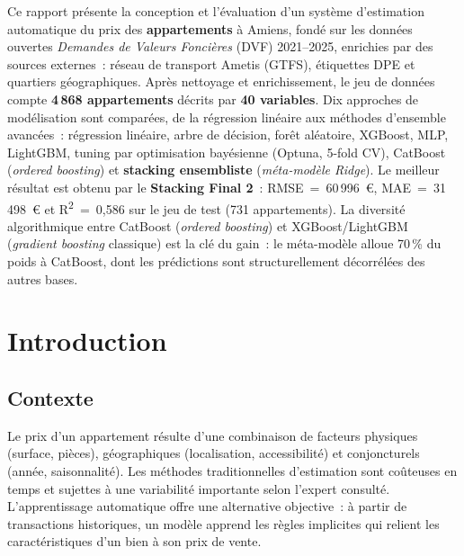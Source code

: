 \documentclass[12pt,a4paper]{article}
\begin{document}
\vspace{0.3cm}

Ce rapport pr\'esente la conception et l'\'evaluation d'un syst\`eme d'estimation automatique du prix des \textbf{appartements} \`a Amiens, fond\'e sur les donn\'ees ouvertes \textit{Demandes de Valeurs Fonci\`eres} (DVF) 2021--2025, enrichies par des sources externes~: r\'eseau de transport Ametis (GTFS), \'etiquettes DPE et quartiers g\'eographiques. Apr\`es nettoyage et enrichissement, le jeu de donn\'ees compte \textbf{4\,868 appartements} d\'ecrits par \textbf{40 variables}. Dix approches de mod\'elisation sont compar\'ees, de la r\'egression lin\'eaire aux m\'ethodes d'ensemble avanc\'ees~: r\'egression lin\'eaire, arbre de d\'ecision, for\^et al\'eatoire, XGBoost, MLP, LightGBM, tuning par optimisation bay\'esienne (Optuna, 5-fold CV), CatBoost (\textit{ordered boosting}) et \textbf{stacking ensembliste} (\textit{m\'eta-mod\`ele Ridge}). Le meilleur r\'esultat est obtenu par le \textbf{Stacking Final 2}~: RMSE~=~60\,996~\euro{}, MAE~=~31\,498~\euro{} et R\textsuperscript{2}~=~0{,}586 sur le jeu de test (731 appartements). La diversit\'e algorithmique entre CatBoost (\textit{ordered boosting}) et XGBoost/LightGBM (\textit{gradient boosting} classique) est la cl\'e du gain~: le m\'eta-mod\`ele alloue 70\,\% du poids \`a CatBoost, dont les pr\'edictions sont structurellement d\'ecorr\'el\'ees des autres bases.

\vspace{0.3cm}
\newpage

\section{Introduction}
\label{sec:introduction}

\subsection{Contexte}

Le prix d'un appartement r\'esulte d'une combinaison de facteurs physiques (surface, pi\`eces), g\'eographiques (localisation, accessibilit\'e) et conjoncturels (ann\'ee, saisonnalit\'e). Les m\'ethodes traditionnelles d'estimation sont co\^uteuses en temps et sujettes \`a une variabilit\'e importante selon l'expert consulté. L'apprentissage automatique offre une alternative objective~: \`a partir de transactions historiques, un mod\`ele apprend les r\`egles implicites qui relient les caract\'eristiques d'un bien \`a son prix de vente.
\end{document}
